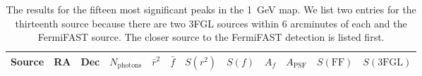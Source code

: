 \documentclass[useAMS,usenatbib]{mn2e}
\begin{document}
\begin{table}
  \caption{The results for the fifteen most significant peaks in the
    1~GeV map.  We list two entries for the thirteenth source because
    there are two 3FGL sources within 6 arcminutes of each and the
    FermiFAST source.  The closer source to the FermiFAST detection is
    listed first.}
  \label{tab:topten}
  \begin{tabular}{lrrrrrrrrrrr}
    \hline
     Source & \multicolumn{1}{c}{RA} & \multicolumn{1}{c}{Dec}  & \multicolumn{1}{c}{$N_\mathrm{photons}$}  &\multicolumn{1}{c}{$\bar r^2$} & \multicolumn{1}{c}{$\bar f$} & \multicolumn{1}{c}{$S(r^2)$} & \multicolumn{1}{c}{$S(f)$} & \multicolumn{1}{c}{$A_f$}  & \multicolumn{1}{c}{$A_\mathrm{PSF}$} & \multicolumn{1}{c}{$S(\mathrm{FF})$} & \multicolumn{1}{c}{$S(\mathrm{3FGL})$} \\
    \hline


\end{tabular}
\end{table}
\end{document}

